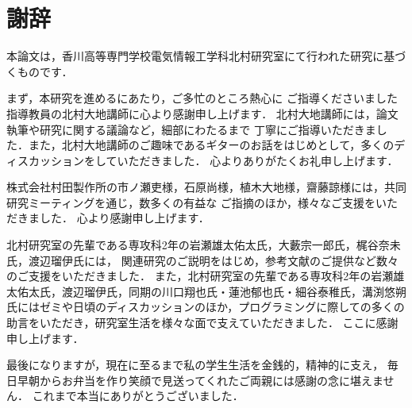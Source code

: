 \chapter{謝辞}

本論文は，香川高等専門学校電気情報工学科北村研究室にて行われた研究に基づくものです．

まず，本研究を進めるにあたり，ご多忙のところ熱心に
ご指導くださいました指導教員の北村大地講師に心より感謝申し上げます．
北村大地講師には，論文執筆や研究に関する議論など，細部にわたるまで
丁寧にご指導いただきました．また，北村大地講師のご趣味であるギターのお話をはじめとして，多くのディスカッションをしていただきました．
心よりありがたくお礼申し上げます．

株式会社村田製作所の市ノ瀬吏様，石原尚様，植木大地様，齋藤諒様には，共同研究ミーティングを通じ，数多くの有益な
ご指摘のほか，様々なご支援をいただきました．
心より感謝申し上げます．

北村研究室の先輩である専攻科2年の岩瀬雄太佑太氏，大藪宗一郎氏，梶谷奈未氏，渡辺瑠伊氏には，
関連研究のご説明をはじめ，参考文献のご提供など数々のご支援をいただきました．
また，北村研究室の先輩である専攻科2年の岩瀬雄太佑太氏，渡辺瑠伊氏，同期の川口翔也氏・蓮池郁也氏・細谷泰稚氏，溝渕悠朔氏にはゼミや日頃のディスカッションのほか，プログラミングに際しての多くの助言をいただき，研究室生活を様々な面で支えていただきました．
ここに感謝申し上げます．

最後になりますが，現在に至るまで私の学生生活を金銭的，精神的に支え，
毎日早朝からお弁当を作り笑顔で見送ってくれたご両親には感謝の念に堪えません．
これまで本当にありがとうございました．
